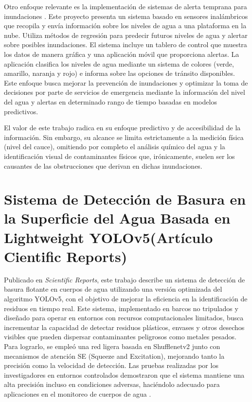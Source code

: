 Otro enfoque relevante es la implementación de sistemas de alerta temprana para inundaciones \cite{perez2024}. Este proyecto presenta un sistema basado en sensores inalámbricos que recopila y envía información sobre los niveles de agua a una plataforma en la nube. Utiliza métodos de regresión para predecir futuros niveles de agua y alertar sobre posibles inundaciones. El sistema incluye un tablero de control que muestra los datos de manera gráfica y una aplicación móvil que proporciona alertas. La aplicación clasifica los niveles de agua mediante un sistema de colores (verde, amarillo, naranja y rojo) e informa sobre las opciones de tránsito disponibles. Este enfoque busca mejorar la prevención de inundaciones y optimizar la toma de decisiones por parte de servicios de emergencia mediante la información del nivel del agua y alertas en determinado rango de tiempo basadas en modelos predictivos.

El valor de este trabajo radica en su enfoque predictivo y de accesibilidad de la información. Sin embargo, su alcance se limita estrictamente a la medición física (nivel del cauce), omitiendo por completo el análisis químico del agua y la identificación visual de contaminantes físicos que, irónicamente, suelen ser los causantes de las obstrucciones que derivan en dichas inundaciones.

\section{Sistema de Detección de Basura en la Superficie del Agua Basada en Lightweight YOLOv5(Artículo Cientific Reports)}

Publicado en \textit{Scientific Reports}, este trabajo describe un sistema de detección de basura flotante en cuerpos de agua utilizando una versión optimizada del algoritmo YOLOv5, con el objetivo de mejorar la eficiencia en la identificación de residuos en tiempo real. Este sistema, implementado en barcos no tripulados y diseñado para operar en entornos con recursos computacionales limitados, busca incrementar la capacidad de detectar residuos plásticos, envases y otros desechos visibles que pueden dispersar contaminantes peligrosos como metales pesados. Para lograrlo, se empleó una red ligera basada en Shufflenetv2 junto con mecanismos de atención SE (Squeeze and Excitation), mejorando tanto la precisión como la velocidad de detección. Las pruebas realizadas por los investigadores en entornos controlados demostraron que el sistema mantiene una alta precisión incluso en condiciones adversas, haciéndolo adecuado para aplicaciones en el monitoreo de cuerpos de agua \cite{chen2024}.

